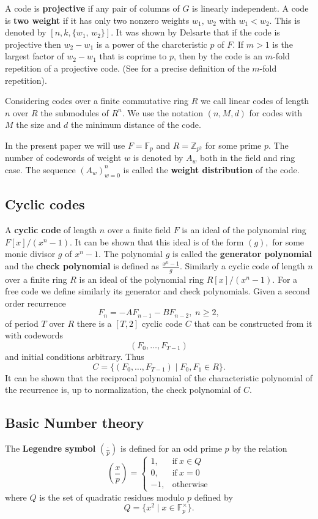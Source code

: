 \documentclass[12pt,reqno]{amsart}
\newcommand{\F}{\mathbb{F}}
\newcommand{\Z}{\mathbb{Z}}
\begin{document}
A code is {\bf projective} if any pair of columns of $G$ is linearly independent.
A code is {\bf two weight} if it has only two nonzero weights $w_1,\,w_2$ with $w_1 < w_2$.  This is denoted
by $[n,k,\{w_1,\,w_2\}].$ It was shown by Delsarte that if the code is projective then $w_2-w_1$ is a power of the
charcteristic $p$ of $F.$
If  $m>1$ is the largest factor of $w_2-w_1$ that is coprime to $p$,
 then by \cite{K} the code is an $m$-fold repetition of a projective code. (See \cite{K} for a precise definition of the $m$-fold repetition).

Considering codes over a finite commutative ring $R$ we call linear codes of length $n$ over $R$ the
submodules of $R^n.$ We use the notation $(n,M,d)$ for codes with $M$ the size and $d$ the minimum distance of the code.

In the present paper we will use $F=\F_p$ and $R=\Z_{p^2}$ for some prime $p.$
The number of codewords of weight $w$ is denoted by $A_w$ both in the field and ring case. The sequence $(A_w)_{w=0}^n$ is called the {\bf weight distribution} of the code.

\subsection{Cyclic codes}

A {\bf cyclic code} of length $n$
over a finite field $F$ is an ideal of the polynomial ring $F[x]/(x^n-1).$ It can be shown that this ideal is of the form $(g),$ for some monic divisor $g$ of $x^n-1.$ The polynomial $g$ is called the
{\bf generator polynomial}  and the  {\bf check polynomial} is defined as $\frac{x^n-1}{g}.$
Similarly
a cyclic code of length $n$
over a finite ring $R$ is an ideal of the polynomial ring $R[x]/(x^n-1).$ For a free code we define similarly its generator and check polynomials.
Given a second order recurrence $$F_{n}=-AF_{n-1}-BF_{n-2},\; n\ge 2,$$ of period $T$
over $R$ there is a $[T,2]$ cyclic code $C$ that can be constructed from it with codewords
$$ (F_0,\dots,F_{T-1})$$
and initial conditions arbitrary. Thus
$$C=\{(F_0,\dots,F_{T-1}) \mid F_0,F_1 \in R\}.$$
It can be shown that the reciprocal polynomial of the characteristic polynomial of the recurrence is, up to normalization, the check polynomial of $C.$

\subsection{Basic Number theory} \label{sub-number-theory}
The {\bf Legendre symbol} $(\frac{.}{p})$ is defined for an odd prime $p$ by the relation
$$\left(\frac{x}{p}\right)=
                \begin{cases}
      1, & \text{if}\ x \in Q \\
      0 ,& \text{if}\ x=0\\
      -1, & \text{otherwise}
    \end{cases}
 $$
 where $Q$ is the set of quadratic residues modulo $p$ defined by
 $$Q=\{x^2 \mid x \in \F_p^\times\}.$$
\end{document}
